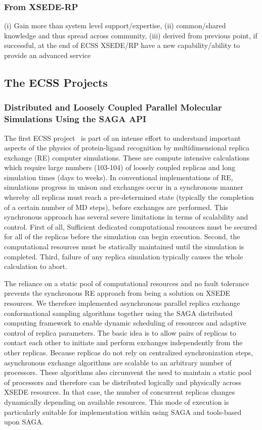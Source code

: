 \documentclass{sig-alternate}
\begin{document}
\subsubsection{From XSEDE-RP} (i) Gain more than system level support/expertise, (ii)
common/shared knowledge and thus spread across community, (iii)
derived from previous point, if successful, at the end of ECSS
XSEDE/RP have a new capability/ability to provide an advanced service

\subsection{The ECSS Projects}

\subsubsection{Distributed and Loosely Coupled Parallel Molecular Simulations
Using the SAGA API}
The first ECSS project~\cite{RonLevy} is part of an intense effort to understand
important aspects of the physics of protein-ligand recognition by
multidimensional replica exchange (RE) computer simulations. These are
compute intensive calculations which require large numbers (103-104) of
loosely coupled replicas and long simulation times (days to weeks). In
conventional implementations of RE, simulations progress in unison and
exchanges occur in a synchronous manner whereby all replicas must
reach a pre-determined state (typically the completion of a certain
number of MD steps), before exchanges are performed. This synchronous
approach has several severe limitations in terms of scalability and
control. First of all, Sufficient dedicated computational resources must
be secured for all of the replicas before the simulation can begin
execution. Second, the computational resources must be statically
maintained until the simulation is completed. Third, failure of any
replica simulation typically causes the whole calculation to abort.

The reliance on a static pool of computational resources and no
fault tolerance prevents the synchronous RE approach from being a
solution on XSEDE resources. We therefore implemented asynchronous
parallel replica exchange conformational sampling algorithms together
using the SAGA distributed computing framework to enable dynamic
scheduling of resources and adaptive control of replica
parameters. The basic idea is to allow pairs of replicas to contact
each other to initiate and perform exchanges independently from the
other replicas. Because replicas do not rely on centralized
synchronization steps, asynchronous exchange algorithms are scalable to an
arbitrary number of processors. These algorithms also circumvent
the need to maintain a static pool of processors and therefore
can be distributed logically and physically across XSEDE resources.
In that case, the number of concurrent replicas changes dynamically
depending on available resources. This mode of execution is particularly
suitable for implementation within using SAGA and tools-based upon SAGA.
\end{document}

